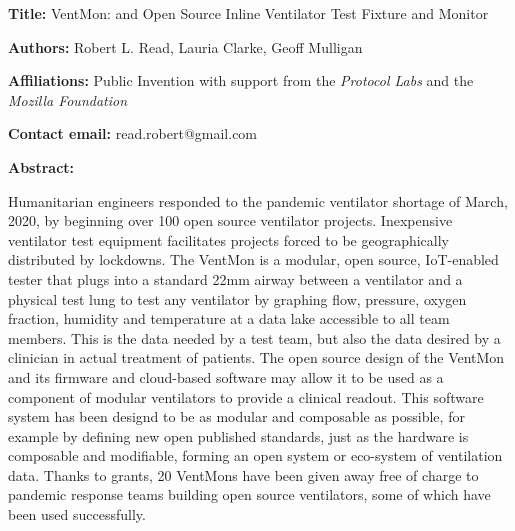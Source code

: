 \documentclass[11pt, letterpaper]{article}
\begin{document}
\begin{flushleft}


\setlength{\parindent}{0pt}
\setlength{\parskip}{10pt}

\textbf{Title:} VentMon: and Open Source Inline Ventilator Test Fixture and Monitor

\textbf{Authors:} Robert L. Read, Lauria Clarke, Geoff Mulligan

\textbf{Affiliations:} Public Invention with support from the \textit{Protocol Labs} and the \textit{Mozilla Foundation}

\textbf{Contact email:} read.robert@gmail.com

\textbf{Abstract:}

Humanitarian engineers responded to the pandemic ventilator shortage of March,
2020, by beginning over 100 open source ventilator projects.
Inexpensive ventilator test equipment facilitates projects forced
to be geographically distributed by lockdowns.
The VentMon is a modular, open source, IoT-enabled
tester that plugs into a standard 22mm airway
between a ventilator and a physical test lung to test any ventilator
by graphing flow, pressure, oxygen fraction, humidity and temperature
at a data lake accessible to all team members. This is the data
needed by a test team, but also the data desired by a clinician in
actual treatment of patients. The open source design of the VentMon
and its firmware and cloud-based software may
allow it to be used as a component of modular ventilators to provide
a clinical readout. This software system has been designd to be as
modular and composable as possible, for example by defining
new open published standards, just as the hardware is composable
and modifiable, forming an open system or eco-system of ventilation data.
Thanks to grants, 20 VentMons have been given away
free of charge to pandemic response teams building open source ventilators,
some of which have been used successfully.




\end{flushleft}
\end{document}
